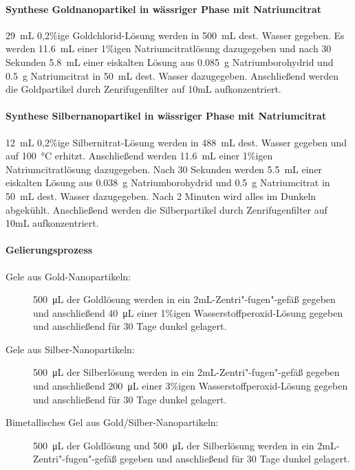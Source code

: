 			\paragraph{Synthese Goldnanopartikel in wässriger Phase mit Natriumcitrat}
			
			\SI{29}{\milli\liter} 0,2\%ige Goldchlorid-Lösung werden in \SI{500}{\milli\liter} dest. Wasser gegeben.
			Es werden \SI{11,6}{\milli\liter} einer 1\%igen Natriumcitratlösung dazugegeben und nach 30 Sekunden \SI{5,8}{\milli\liter}	einer eiskalten Lösung aus \SI{0,085}{\gram} Natriumborohydrid und \SI{0,5}{\gram} Natriumcitrat in \SI{50}{\milli\liter} dest. Wasser dazugegeben.
			Anschließend werden die Goldpartikel durch Zenrifugenfilter auf 10mL aufkonzentriert.
			
			\paragraph{Synthese Silbernanopartikel in wässriger Phase mit Natriumcitrat}
			
			\SI{12}{\milli\liter} 0,2\%ige Silbernitrat-Lösung werden in \SI{488}{\milli\liter} dest. Wasser gegeben und auf \SI{100}{\degreeCelsius} erhitzt.
			Anschließend werden \SI{11,6}{\milli\liter} einer 1\%igen Natriumcitratlösung dazugegeben.
			Nach 30 Sekunden werden  \SI{5,5}{\milli\liter}	einer eiskalten Lösung aus \SI{0,038}{\gram} Natriumborohydrid und \SI{0,5}{\gram} Natriumcitrat in \SI{50}{\milli\liter} dest. Wasser dazugegeben.
			Nach 2 Minuten wird alles im Dunkeln abgekühlt.
			Anschließend werden die Silberpartikel durch Zenrifugenfilter auf 10mL aufkonzentriert.
			
			\paragraph{Gelierungsprozess}
			    \begin{description}
			    \item[Gele aus Gold-Nanopartikeln:]
			    \SI{500}{\micro\liter} der Goldlösung werden in ein 2mL-Zentri"-fugen"-gefäß gegeben und anschließend \SI{40}{\micro\liter} einer 1\%igen Wasserstoffperoxid-Lösung gegeben und anschließend für 30 Tage dunkel gelagert.
			    \item[Gele aus Silber-Nanopartikeln:]
			    \SI{500}{\micro\liter} der Silberlösung werden in ein 2mL-Zentri"-fugen"-gefäß gegeben und anschließend \SI{200}{\micro\liter} einer 3\%igen Wasserstoffperoxid-Lösung gegeben und anschließend für 30 Tage dunkel gelagert.
			    \item[Bimetallisches Gel aus Gold/Silber-Nanopartikeln:]
			    \SI{500}{\micro\liter} der Goldlösung und 	\SI{500}{\micro\liter} der Silberlösung werden in ein 2mL-Zentri"-fugen"-gefäß gegeben und anschließend für 30 Tage dunkel gelagert.
			    \end{description}
			   	
